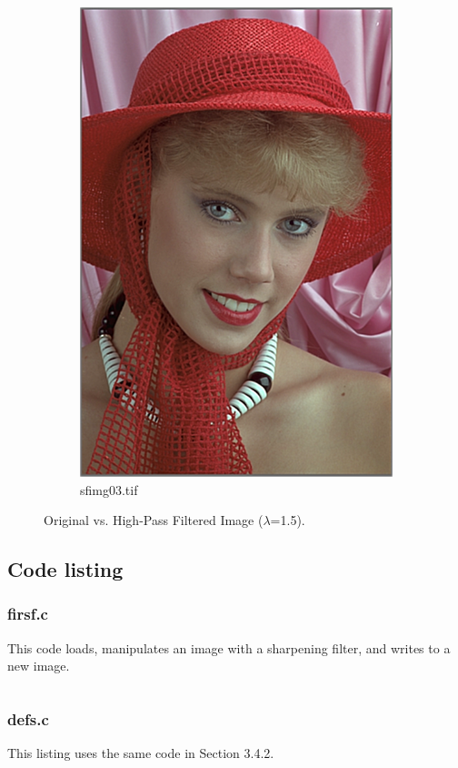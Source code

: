 \documentclass{article}
\begin{document}
\begin{figure}[h]
\begin{subfigure}{0.5\textwidth}
\includegraphics[width=0.9\linewidth, right]{firsf}
\caption{sfimg03.tif}
\end{subfigure}
\caption{Original vs. High-Pass Filtered Image ($\lambda$=1.5).}
\end{figure}

\subsection{Code listing}
\subsubsection{firsf.c}
This code loads, manipulates an image with a sharpening filter, and writes to a new image.
\inputminted[tabsize=4]{c}{firsf.c}
\subsubsection{defs.c}
This listing uses the same code in Section 3.4.2.
\end{document}
